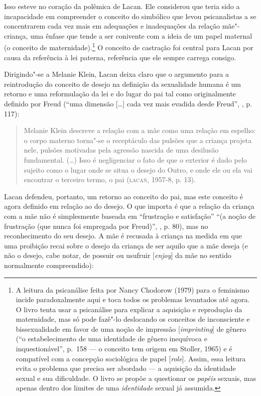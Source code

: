 Isso esteve no coração da polêmica de Lacan. Ele considerou que teria
sido a incapacidade em compreender o conceito do simbólico que levou
psicanalistas a se concentrarem cada vez mais em adequações e
inadequações da relação mãe"-criança, uma ênfase que tende a ser
conivente com a ideia de um papel maternal (o conceito de
maternidade).\footnote{A leitura da psicanálise feita por Nancy Chodorow
  (1979) para o feminismo incide paradoxalmente aqui e toca
  todos os problemas levantados até agora. O livro tenta usar a
  psicanálise para explicar a aquisição e reprodução da maternidade, mas
  só pode fazê"-lo deslocando os conceitos de inconsciente e
  bissexualidade em favor de uma noção de impressão
  {[}\emph{imprinting}{]} de gênero (``o estabelecimento de uma
  identidade de gênero inequívoca e inquestionável'', p.~158 --- o
  conceito tem origem em Stoller, 1965) e é compatível com a concepção
  sociológica de papel {[}\emph{role}{]}. Assim, essa leitura evita o
  problema que precisa ser abordado --- a aquisição da identidade sexual
  e sua dificuldade. O livro se propõe a questionar os \emph{papéis}
  sexuais, mas apenas dentro dos limites de uma \emph{identidade} sexual
  já assumida.} O conceito de castração foi central para Lacan por
causa da referência à lei paterna, referência que ele sempre carrega
consigo.

Dirigindo"-se a Melanie Klein, Lacan deixa claro que o argumento para a
reintrodução do conceito de desejo na definição da sexualidade humana é
um retorno e uma reformulação da lei e do lugar do pai tal como
originalmente definido por Freud (``uma dimensão {[}\ldots{}{]} cada vez mais
evadida desde Freud'', , p. 117):

\begin{quote}
Melanie Klein descreve a relação com a mãe como uma relação em espelho:
o corpo materno torna"-se o receptáculo das pulsões que a criança projeta
nele, pulsões motivadas pela agressão nascida de uma desilusão
fundamental. (\ldots{}) Isso é negligenciar o fato de que o exterior é dado
pelo sujeito como o lugar onde se situa o desejo do Outro, e onde ele ou
ela vai encontrar o terceiro termo, o pai (\textsc{lacan}, 1957-8, p. 13).
\end{quote}

Lacan defendeu, portanto, um retorno ao conceito do pai, mas este
conceito é agora definido em relação ao do desejo. O que importa é que a
relação da criança com a mãe não é simplesmente baseada em ``frustração e
satisfação'' ``(a noção de frustração (que nunca foi empregada por %
Freud)'', , p. 80), mas no reconhecimento do seu desejo. A mãe é
recusada à criança na medida em que uma proibição recai sobre o desejo
da criança de ser aquilo que a mãe deseja (e não o desejo, cabe notar,
de possuir ou usufruir {[}\emph{enjoy}{]} da mãe no sentido normalmente
compreendido):

